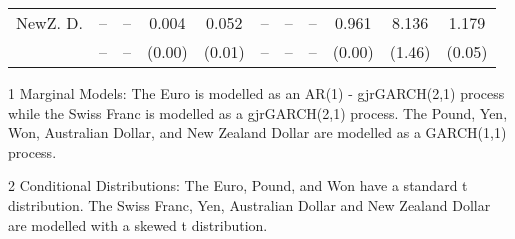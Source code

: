 \documentclass[12pt]{article}
\begin{document}
\begin{landscape}
\begin{table}
\begin{threeparttable}
\begin{tabular}[l]{l c c | c c c c c c | c c}
NewZ. D. & --     & --        & 0.004  & 0.052       & --          & --          & --          & 0.961  & 8.136  & 1.179  \\
         & --     & --        & (0.00) & (0.01)      & --          & --          & --          & (0.00) & (1.46) & (0.05) \\
\hline \hline
	\end{tabular}
	\begin{tablenotes}
		\item[1]{\footnotesize Marginal Models: The Euro is modelled as an AR(1) - gjrGARCH(2,1) process while the Swiss Franc is modelled as a gjrGARCH(2,1) process. The Pound, Yen, Won, Australian Dollar, and New Zealand Dollar are modelled as a GARCH(1,1) process.}
		\item[2]{\footnotesize Conditional Distributions: The Euro, Pound, and Won have a standard t distribution. The Swiss Franc, Yen, Australian Dollar and New Zealand Dollar are modelled with a skewed t distribution.}
	\end{tablenotes}
\end{threeparttable}
\end{table}

\end{landscape}

\vspace{10mm}
\end{document}

